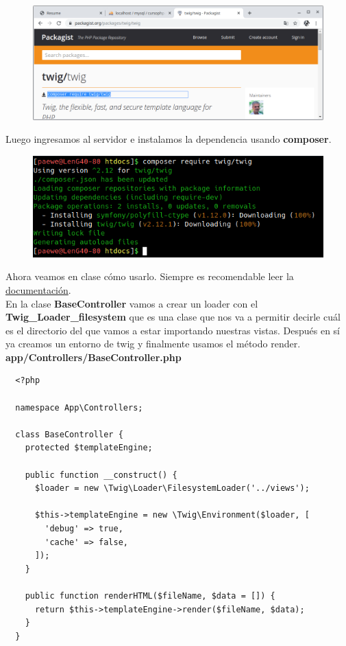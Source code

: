 \documentclass{article}
\begin{document}
\begin{figure}[h!]
  \centering
  \includegraphics[scale=0.5]{./Pictures/153_composer_twig.png}
\end{figure}

Luego ingresamos al servidor e instalamos la dependencia usando
\textbf{composer}.\\

\begin{figure}[h!]
  \centering
  \includegraphics[scale=0.75]{./Pictures/154_twig_install.png}
\end{figure}

Ahora veamos en clase cómo usarlo. Siempre es recomendable leer la
\href{https://twig.symfony.com/doc/2.x/}{documentación}.\\

En la clase \textbf{BaseController} vamos a crear un loader con el
\textbf{Twig\_Loader\_filesystem} que es una clase que nos va a permitir decirle
cuál es el directorio del que vamos a estar importando nuestras vistas. Después
en sí ya creamos un entorno de twig y finalmente usamos el método render.\\

\textbf{app/Controllers/BaseController.php}
\begin{verbatim}
  <?php

  namespace App\Controllers;

  class BaseController {
    protected $templateEngine;

    public function __construct() {
      $loader = new \Twig\Loader\FilesystemLoader('../views');

      $this->templateEngine = new \Twig\Environment($loader, [
        'debug' => true,
        'cache' => false,
      ]);
    }

    public function renderHTML($fileName, $data = []) {
      return $this->templateEngine->render($fileName, $data);
    }
  }
\end{verbatim}
\end{document}
